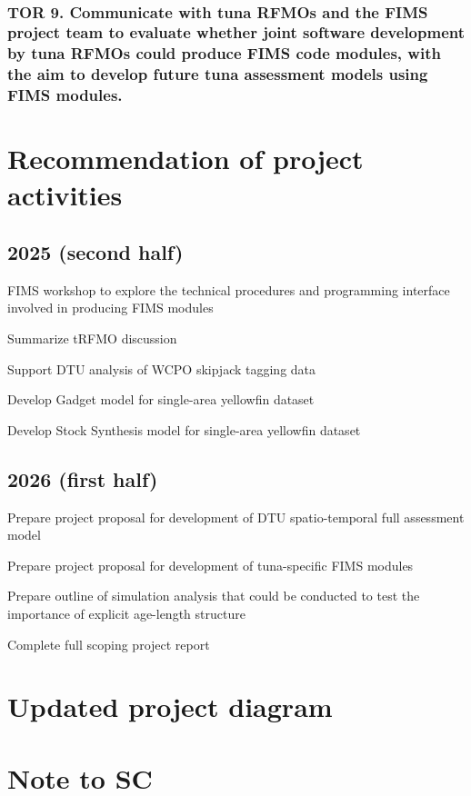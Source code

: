 \documentclass{SCreport}
\begin{document}
~

\subsubsection{TOR 9. Communicate with tuna RFMOs and the FIMS project team to
  evaluate whether joint software development by tuna RFMOs could produce FIMS
  code modules, with the aim to develop future tuna assessment models using FIMS
  modules.}

\section{Recommendation of project activities}

\subsection{2025 (second half)}

FIMS workshop to explore the technical procedures and programming interface
involved in producing FIMS modules

Summarize tRFMO discussion

Support DTU analysis of WCPO skipjack tagging data

Develop Gadget model for single-area yellowfin dataset

Develop Stock Synthesis model for single-area yellowfin dataset

\subsection{2026 (first half)}

Prepare project proposal for development of DTU spatio-temporal full assessment
model

Prepare project proposal for development of tuna-specific FIMS modules

Prepare outline of simulation analysis that could be conducted to test the
importance of explicit age-length structure

Complete full scoping project report

\section{Updated project diagram}

\section{Note to SC}
\end{document}
